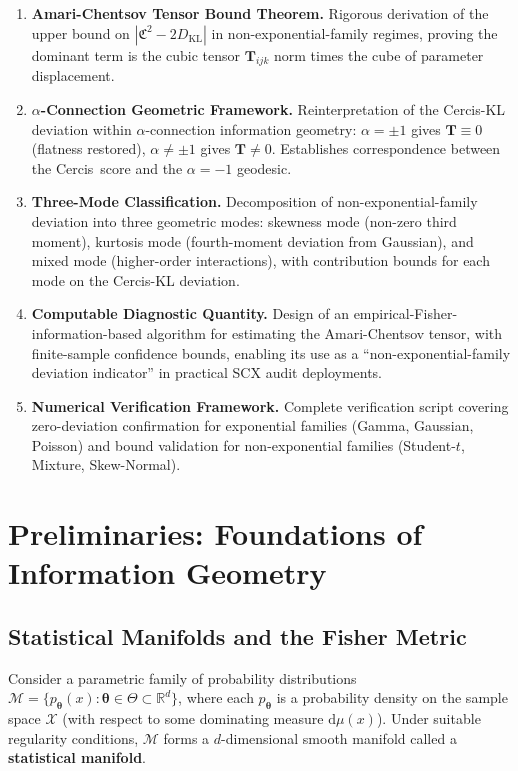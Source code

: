 \documentclass[12pt,a4paper]{article}
\theoremstyle{plain}
\theoremstyle{definition}
\theoremstyle{remark}
\newcommand{\R}{\mathbb{R}}
\newcommand{\SCX}{\textsf{SCX}}
\newcommand{\Cercis}{\textsf{Cercis}}
\newcommand{\dd}{\mathrm{d}}
\newcommand{\MM}{\mathcal{M}}
\newcommand{\DKL}{D_{\mathrm{KL}}}
\newcommand{\CercisScore}{\mathfrak{C}}
\newcommand{\ACT}{\mathbf{T}}    %
\begin{document}
\begin{enumerate}[label=\textbf{C\arabic*}, leftmargin=*]
    \item \textbf{Amari-Chentsov Tensor Bound Theorem.} Rigorous derivation of the upper bound on $|\CercisScore^2 - 2\DKL|$ in non-exponential-family regimes, proving the dominant term is the cubic tensor $\ACT_{ijk}$ norm times the cube of parameter displacement.
    \item \textbf{$\alpha$-Connection Geometric Framework.} Reinterpretation of the \Cercis-KL deviation within $\alpha$-connection information geometry: $\alpha = \pm 1$ gives $\ACT \equiv 0$ (flatness restored), $\alpha \neq \pm 1$ gives $\ACT \neq 0$. Establishes correspondence between the \Cercis\ score and the $\alpha = -1$ geodesic.
    \item \textbf{Three-Mode Classification.} Decomposition of non-exponential-family deviation into three geometric modes: skewness mode (non-zero third moment), kurtosis mode (fourth-moment deviation from Gaussian), and mixed mode (higher-order interactions), with contribution bounds for each mode on the \Cercis-KL deviation.
    \item \textbf{Computable Diagnostic Quantity.} Design of an empirical-Fisher-information-based algorithm for estimating the Amari-Chentsov tensor, with finite-sample confidence bounds, enabling its use as a ``non-exponential-family deviation indicator'' in practical \SCX{} audit deployments.
    \item \textbf{Numerical Verification Framework.} Complete verification script covering zero-deviation confirmation for exponential families (Gamma, Gaussian, Poisson) and bound validation for non-exponential families (Student-$t$, Mixture, Skew-Normal).
\end{enumerate}

\section{Preliminaries: Foundations of Information Geometry}
\label{sec:prelim}

\subsection{Statistical Manifolds and the Fisher Metric}

Consider a parametric family of probability distributions $\MM = \{p_{\bm{\theta}}(x) : \bm{\theta} \in \Theta \subset \R^d\}$, where each $p_{\bm{\theta}}$ is a probability density on the sample space $\mathcal{X}$ (with respect to some dominating measure $\dd\mu(x)$). Under suitable regularity conditions, $\MM$ forms a $d$-dimensional smooth manifold called a \textbf{statistical manifold}.
\end{document}

